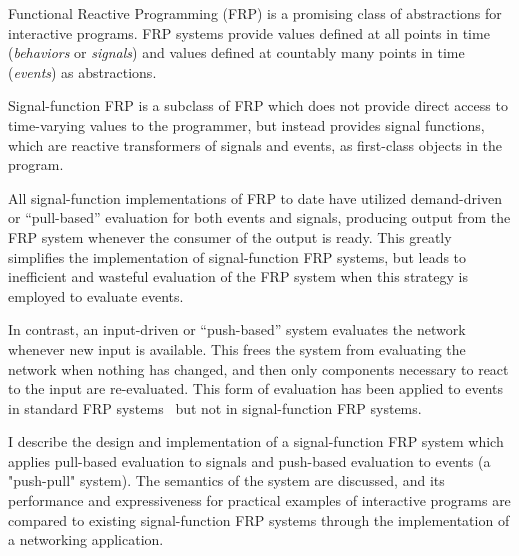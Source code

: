Functional Reactive Programming (FRP) is a promising class of abstractions for
interactive programs. FRP systems provide values defined at all points in time
({\em behaviors} or {\em signals}) and values defined at countably many points
in time ({\em events}) as abstractions.

Signal-function FRP is a subclass of FRP which does not provide direct access to
time-varying values to the programmer, but instead provides signal functions,
which are reactive transformers of signals and events, as first-class objects in
the program. 

All signal-function implementations of FRP to date have utilized demand-driven
or ``pull-based''  evaluation for both events and signals, producing output from
the FRP system whenever the consumer of the output is ready. This greatly
simplifies the implementation of signal-function FRP systems, but leads to
inefficient and wasteful evaluation of the FRP system when this strategy is
employed to evaluate events.

In contrast, an input-driven or ``push-based'' system evaluates the network
whenever new input is available. This frees the system from evaluating the
network when nothing has changed, and then only components necessary to react to
the input are re-evaluated. This form of evaluation has been applied to events
in standard FRP systems~\cite{Elliott2009} but not in signal-function FRP
systems.

I describe the design and implementation of a signal-function FRP system which
applies pull-based evaluation to signals and push-based evaluation to events (a
"push-pull" system). The semantics of the system are discussed, and its
performance and expressiveness for practical examples of interactive programs
are compared to existing signal-function FRP systems through the implementation
of a networking application.
